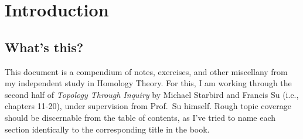 \documentclass[verbose]{fkbook}
\begin{document}
\pagestyle{plain}
\frontmatter


\maketitlepage
\tableofcontents

\chapter{Introduction}
\section*{What's this?}\noindent\indent
This document is a compendium of notes, exercises, and other miscellany from my
independent study in Homology Theory. For this, I am working through the second
half of \emph{Topology Through Inquiry} by Michael Starbird and Francis Su
(i.e., chapters 11-20), under supervision from Prof.\ Su himself. Rough topic
coverage should be discernable from the table of contents, as I've tried to
name each section identically to the corresponding title in the book.
\end{document}
